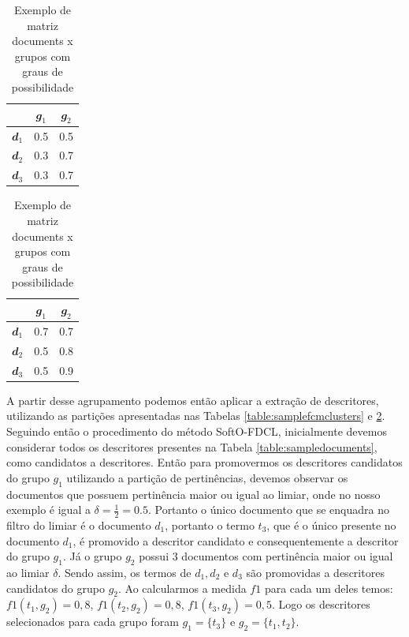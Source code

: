 \begin{table}[!htp]
  \begin{minipage}{0.45\textwidth} 
    \centering
    \begin{tabular}{ |c|c|c|}
      \hline
      & $\mathbfit{g_1}$ & $\mathbfit{g_2}$ \\
      \hline
      $\mathbfit{d_1}$ & 0.5 & 0.5 \\
      \hline
      $\mathbfit{d_2}$ & 0.3 & 0.7 \\
      \hline
      $\mathbfit{d_3}$ & 0.3 & 0.7 \\
      \hline
    \end{tabular}
    \caption{Exemplo de matriz documents x grupos com graus de pertinência}
    \label{table:samplefcmclusters}
  \end{minipage}\hfill 
  \begin{minipage}{0.45\textwidth} 
    \centering
    \begin{tabular}{ |c|c|c|}
      \hline
      & $\mathbfit{g_1}$ & $\mathbfit{g_2}$ \\
      \hline
      $\mathbfit{d_1}$ & 0.7 & 0.7 \\
      \hline
      $\mathbfit{d_2}$ & 0.5 & 0.8 \\
      \hline
      $\mathbfit{d_3}$ & 0.5 & 0.9 \\
      \hline
    \end{tabular}
    \caption{Exemplo de matriz documents x grupos com graus de possibilidade}
    \label{table:samplepcmclusters}
  \end{minipage}\hfill 
\end{table}

A partir desse agrupamento podemos então aplicar a extração de descritores, utilizando as partições
apresentadas nas Tabelas \ref{table:samplefcmclusters} e \ref{table:samplepcmclusters}. Seguindo
então o procedimento do método SoftO-FDCL, inicialmente devemos considerar todos os descritores
presentes na Tabela \ref{table:sampledocuments}, como candidatos a descritores. Então para
promovermos os descritores candidatos do grupo $g_1$ utilizando a partição de pertinências, devemos 
observar os documentos que possuem pertinência maior ou igual ao limiar, onde no nosso exemplo é
igual a $\delta = \frac{1}{2} = 0.5$. Portanto o único documento que se enquadra no filtro do limiar
é o documento $d_1$, portanto o termo $t_3$, que é o único presente no documento $d_1$, é promovido
a descritor candidato e consequentemente a descritor do grupo $g_1$. Já o grupo $g_2$ possui 3
documentos com pertinência maior ou igual ao limiar $\delta$. Sendo assim, os termos de $d_1,d_2$ e
$d_3$ são promovidas a descritores candidatos do grupo $g_2$. Ao calcularmos a medida $f1$ para cada
um deles temos: $f1(t_1,g_2) = 0,8$, $f1(t_2,g_2) = 0,8$, $f1(t_3,g_2) = 0,5$. Logo os descritores
selecionados para cada grupo foram $g_1 =\{t_3\}$ e $g_2 = \{t_1, t_2\}$.

